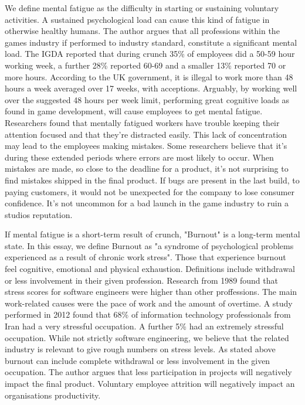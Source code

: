 \documentclass{scrartcl}
\begin{document}
We define mental fatigue as the difficulty in starting or sustaining voluntary activities\cite{chaudhuri2004fatigue}. A sustained psychological load can cause this kind of fatigue in otherwise healthy humans\cite {mizuno2011mental}. The author argues that all professions within the games industry if performed to industry standard, constitute a significant mental load. The IGDA reported that during crunch 35\% of employees did a 50-59 hour working week, a further 28\% reported 60-69 and a smaller 13\% reported 70 or more hours\cite[p.20]{weststarlegault2016}. According to the UK government, it is illegal to work more than 48 hours a week averaged over 17 weeks, with acceptions\cite{maximumweeklyhours}. Arguably, by working well over the suggested 48 hours per week limit, performing great cognitive loads as found in game development, will cause employees to get mental fatigue. Researchers found that mentally fatigued workers have trouble keeping their attention focused and that they're distracted easily\cite{bartlett1943ferrier}. This lack of concentration may lead to the employees making mistakes. Some researchers believe that it's during these extended periods where errors are most likely to occur\cite{olson2011overtime}. When mistakes are made, so close to the deadline for a product, it's not surprising to find mistakes shipped in the final product. If bugs are present in the last build, to paying customers, it would not be unexpected for the company to lose consumer confidence.  It's not uncommon for a bad launch in the game industry to ruin a studios reputation. 


If mental fatigue is a short-term result of crunch, "Burnout" is a long-term mental state. In this essay, we define Burnout as "a syndrome of psychological problems experienced as a result of chronic work stress"\cite{milfont2008burnout}. Those that experience burnout feel cognitive, emotional and physical exhaustion\cite{sonnentag1994stressor}. Definitions include withdrawal or less involvement in their given profession\cite{sonnentag1994stressor}. Research from 1989 found that stress scores for software engineers were higher than other proffessions\cite{kumash1989work}. The main work-related causes were the pace of work and the amount of overtime\cite{kumash1989work}. A study performed in 2012 found that 68\% of information technology professionals from Iran had a very stressful occupation\cite{bolhari2012occupational}. A further 5\% had an extremely stressful occupation\cite{bolhari2012occupational}. While not strictly software engineering, we believe that the related industry is relevant to give rough numbers on stress levels. As stated above burnout can include complete withdrawal or less involvement in the given occupation. The author argues that less participation in projects will negatively impact the final product. Voluntary employee attrition will negatively impact an organisations productivity.


\end{document}
